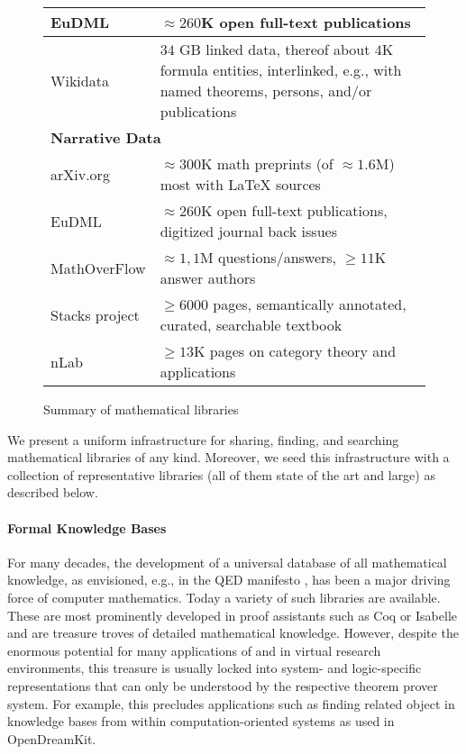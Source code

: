 \begin{figure*}[htp]
\begin{tabular}{| p{} | p{}|}
  EuDML  \cite{EuDML:on} & $\approx 260$K open full-text publications \\\hline
  Wikidata  \cite{wikidata:on} & $34$ GB linked data, thereof about $4$K formula entities, interlinked, e.g., with named theorems, persons, and/or publications \\\hline
  \multicolumn{2}{|l|}{\textbf{Narrative Data}} \\\hline
  arXiv.org & $\approx 300$K math preprints (of $\approx1.6$M) most with {\LaTeX} sources\\\hline
  EuDML  \cite{EuDML:on} & $\approx 260$K open full-text publications, digitized journal back issues \\\hline
  MathOverFlow & $\approx 1,1$M questions/answers, $\geq11$K answer authors \\\hline
  Stacks project & $\geq 6000$ pages, semantically annotated, curated, searchable textbook \\\hline
  nLab & $\geq 13$K pages on category theory and applications\\\hline
\end{tabular}
  \caption{Summary of mathematical libraries}\label{fig:datasets}
\end{figure*}


We present a uniform infrastructure for sharing, finding, and searching mathematical libraries of any kind.
Moreover, we seed this infrastructure with a collection of representative libraries (all of them state of the art and large) as described below.

\paragraph{Formal Knowledge Bases}
For many decades, the development of a universal database of all mathematical knowledge, as envisioned, e.g., in the QED manifesto \cite{qed}, has been a major driving force of computer mathematics.
Today a variety of such libraries are available.
These are most prominently developed in proof assistants such as Coq \cite{coq} or Isabelle \cite{isabelle} and are treasure troves of detailed mathematical knowledge.
However, despite the enormous potential for many applications of and in virtual research environments, this treasure is usually locked into system- and logic-specific representations that can only be understood by the respective theorem prover system.
For example, this precludes applications such as finding related object in knowledge bases from within computation-oriented systems as used in OpenDreamKit.

